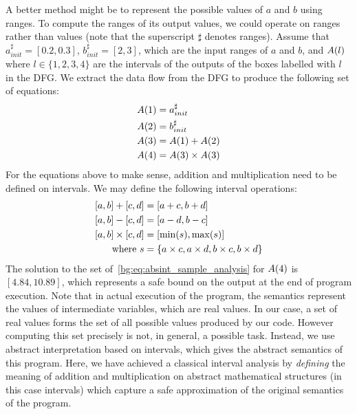 A better method might be to represent the possible values of $a$ and $b$ using
ranges. To compute the ranges of its output values, we could operate on ranges
rather than values (note that the superscript $\sharp$ denotes ranges). Assume
that $a^\sharp_{init} = [0.2, 0.3]$, $b^\sharp_{init} = [2, 3]$, which are the
input ranges of $a$ and $b$, and $A({l})$ where $l \in \{1, 2, 3, 4\}$ are
the intervals of the outputs of the boxes labelled with $l$ in the DFG\@. We
extract the data flow from the DFG to produce the following set of equations:
\begin{equation}
    \begin{aligned}
        A({1}) &= a^\sharp_{init} \\
        A({2}) &= b^\sharp_{init} \\
        A({3}) &= A({1}) + A({2}) \\
        A({4}) &= A({3}) \times A({3})
    \end{aligned}
    \label{bg:eq:absint_sample_analysis}
\end{equation}
For the equations above to make sense, addition and multiplication need to be
defined on intervals. We may define the following interval operations:
\begin{equation}
    \begin{aligned}
        \left[{a}, {b}\right] + \left[{c}, {d}\right] &= \left[{a + c}, {b + d}\right] \\
        \left[{a}, {b}\right] - \left[{c}, {d}\right] &=  \left[{a - d}, {b - c}\right] \\
        \left[{a}, {b}\right] \times \left[{c}, {d}\right] &=
            \left[{\min(s)}, {\max(s)}\right] \\
        \text{where~} s &= \{ a \times c, a \times d, b \times c, b \times d \}
    \end{aligned}
    \label{bg:eq:interval_operations}
\end{equation}
The solution to the set of~\eqref{bg:eq:absint_sample_analysis} for $A({4})$
is $[4.84, 10.89]$, which represents a safe bound on the output at the end
of program execution. Note that in actual execution of the program, the
semantics represent the values of intermediate variables, which are real
values. In our case, a set of real values forms the set of all possible
values produced by our code. However computing this set precisely is not,
in general, a possible task. Instead, we use abstract interpretation based
on intervals, which gives the abstract semantics of this program. Here, we
have achieved a classical interval analysis by \emph{defining} the meaning of
addition and multiplication on abstract mathematical structures (in this case
intervals) which capture a safe approximation of the original semantics of the
program.

